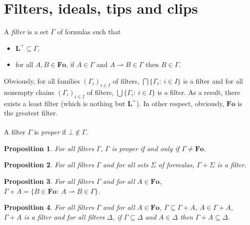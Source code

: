 \documentclass[draft]{article}
\newtheorem{proposition}{Proposition}
\def\Fo{\mathbf{Fo}}
\def\L{\mathbf{L}}
\begin{document}
\section{Filters, ideals, tips and clips}\label{section:filters:ideals:tips:and:clips}
%
%
%
%
%
%
%
%
%
A {\em filter}\/ is a set $\Gamma$ of formulas such that
%
%
\begin{itemize}
%
%
\item $\L^{+}{\subseteq}\Gamma$,
%
%
\item for all $A,B{\in}\Fo$, if $A{\in}\Gamma$ and $A{\rightharpoonup}B{\in}\Gamma$ then $B{\in}\Gamma$.
%
%
\end{itemize}
%
%
%
%
Obviously, for all families $(\Gamma_{i})_{i{\in}I}$ of filters, $\bigcap\{\Gamma_{i}:\ i{\in}I\}$ is a filter and for all nonempty chains $(\Gamma_{i})_{i{\in}I}$ of filters, $\bigcup\{\Gamma_{i}:\ i{\in}I\}$ is a filter.
As a result, there exists a least filter (which is nothing but $\L^{+}$).
In other respect, obviously, $\Fo$ is the greatest filter.
%
%
\\
\\
%
%
A filter $\Gamma$ is {\em proper}\/ if ${\bot}{\not\in}\Gamma$.
%
%
\begin{proposition}\label{Proposition:for:all:constructive:model:logics:the:following:proper:filters}
%
%
For all filters $\Gamma$, $\Gamma$ is proper if and only if $\Gamma{\not=}\Fo$.
%
%
\end{proposition}
%
%
\begin{proposition}\label{Proposition:48bis:Gamma:plus:Sigma:is:a:filter}
%
%
For all filters $\Gamma$ and for all sets $\Sigma$ of formulas, $\Gamma{+}\Sigma$ is a filter.
%
%
\end{proposition}
%
%
\begin{proposition}\label{Proposition:about:filters:formulas:and:operation:plus:for:a:single:formula}
%
%
For all filters $\Gamma$ and for all $A{\in}\Fo$, $\Gamma{+}A{=}\{B{\in}\Fo:\ A{\rightharpoonup}B{\in}\Gamma\}$.
%
%
\end{proposition}
%
%
\begin{proposition}\label{Proposition:for:all:filters:and:for:all:formulas:is:a:filter:for:all:filters:if:and:then}
%
%
For all filters $\Gamma$ and for all $A{\in}\Fo$, $\Gamma{\subseteq}\Gamma{+}A$, $A{\in}\Gamma{+}A$, $\Gamma{+}A$ is a filter and for all filters $\Delta$, if $\Gamma{\subseteq}\Delta$ and $A{\in}\Delta$ then $\Gamma{+}A{\subseteq}\Delta$.
%
%
\end{proposition}
\end{document}
